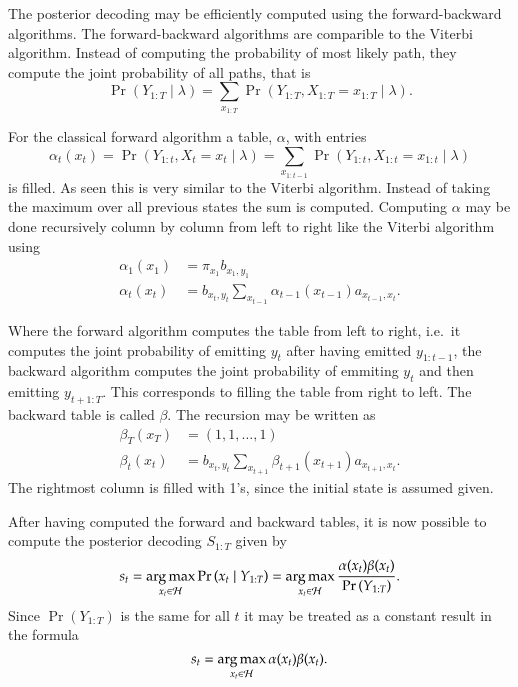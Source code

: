 The posterior decoding may be efficiently computed using the forward-backward
algorithms. The forward-backward algorithms are comparible to the Viterbi
algorithm. Instead of computing the probability of most likely path, they
compute the joint probability of all paths, that is
\begin{equation*}
  \Pr
  \left(
    Y_{1:T} \mid \lambda
  \right) = \sum_{x_{1:T}} \Pr
  \left(
    Y_{1:T}, X_{1:T} = x_{1:T} \mid \lambda
  \right).
\end{equation*}

For the classical forward algorithm a table, $\alpha$, with entries
\begin{equation*}
\alpha_t(x_t) = \Pr \left( Y_{1:t}, X_t = x_t \mid \lambda \right) =
\sum_{x_{1:t-1}} \Pr \left( Y_{1:t}, X_{1:t} = x_{1:t} \mid \lambda \right)
\end{equation*}
is filled. As seen this is very similar to the Viterbi algorithm. Instead of
taking the maximum over all previous states the sum is computed. Computing
$\alpha$ may be done recursively column by column from left to right like the
Viterbi algorithm using
\begin{equation*}
  \begin{aligned}
    \alpha_1(x_1) &= \pi_{x_1} b_{x_1, y_1} \\
    \alpha_t(x_t) &= b_{x_t, y_t} \sum_{x_{t - 1}} \alpha_{t - 1}(x_{t - 1})
    a_{x_{t - 1}, x_t}.
  \end{aligned}
\end{equation*}

Where the forward algorithm computes the table from left to right, i.e.\
it computes the joint probability of emitting $y_t$ after having emitted
$y_{1:t-1}$, the backward algorithm computes the joint probability of emmiting
$y_t$ and then emitting $y_{t+1:T}$. This corresponds to filling the table from
right to left. The backward table is called $\beta$. The recursion may be written as
\begin{equation*}
  \begin{aligned}
    \beta_T(x_T) &= (1, 1, \dots, 1) \\
    \beta_t(x_t) &= b_{x_t, y_t} \sum_{x_{t + 1}} \beta_{t + 1}(x_{t + 1})
    a_{x_{t + 1}, x_t}.
  \end{aligned}
\end{equation*}
The rightmost column is filled with 1's, since the initial state is assumed
given.

After having computed the forward and backward tables, it is now possible to
compute the posterior decoding $S_{1:T}$ given by
\begin{equation*}
  s_t = \operatorname*{arg\,max}_{x_t \in \mathcal{H}} \Pr \left(x_t \mid Y_{1:T} \right) =
  \operatorname*{arg\,max}_{x_t \in \mathcal{H}} \frac{\alpha(x_t) \beta(x_t)}{\Pr \left( Y_{1:T} \right)}.
\end{equation*}
Since $\Pr \left( Y_{1:T} \right)$ is the same for all $t$ it may be treated as
a constant result in the formula
\begin{equation}
  \label{eq:6}
  s_t = \operatorname*{arg\,max}_{x_t \in \mathcal{H}} \alpha(x_t) \beta(x_t).
\end{equation}

